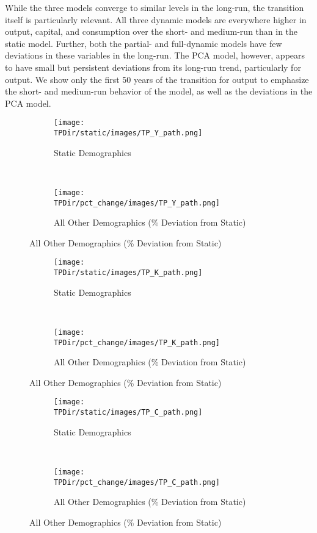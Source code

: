 \documentclass[10pt]{article}
\numberwithin{equation}{subsection}
\newcommand*{\TPDir}{../../code/Rick/OUTPUT/TP}
\begin{document}
\par While the three models converge to similar levels in the long-run, the transition itself is particularly relevant. All three dynamic models are everywhere higher in output, capital, and consumption over the short- and medium-run than in the static model. Further, both the partial- and full-dynamic models have few deviations in these variables in the long-run. The PCA model, however, appears to have small but persistent deviations from its long-run trend, particularly for output. We show only the first 50 years of the transition for output to emphasize the short- and medium-run behavior of the model, as well as the deviations in the PCA model.

\begin{figure}[H]
   \caption{\label{fig:tp_Y_pct}Time Path of Aggregate Output \(\hat{Y}_t\)}
   \begin{subfigure}{0.5\textwidth}
      \centering
      \texttt{[image: \\TPDir/static/images/TP\_Y\_path.png]}
      \caption{Static Demographics}
   \end{subfigure}%
   ~
   \begin{subfigure}{0.5\textwidth}
      \centering
      \texttt{[image: \\TPDir/pct\_change/images/TP\_Y\_path.png]}
      \caption{All Other Demographics (\% Deviation from Static)}
   \end{subfigure}
\end{figure}

\begin{figure}[H]
   \caption{\label{fig:tp_K_pct}Time Path of Aggregate Capital \(\hat{K}_t\)}
   \begin{subfigure}{0.5\textwidth}
      \centering
      \texttt{[image: \\TPDir/static/images/TP\_K\_path.png]}
      \caption{Static Demographics}
   \end{subfigure}%
   ~
   \begin{subfigure}{0.5\textwidth}
      \centering
      \texttt{[image: \\TPDir/pct\_change/images/TP\_K\_path.png]}
      \caption{All Other Demographics (\% Deviation from Static)}
   \end{subfigure}
\end{figure}

\begin{figure}[H]
   \caption{\label{fig:tp_C_pct}Time Path of Aggregate Consumption \(\hat{C}_t\)}
   \begin{subfigure}{0.5\textwidth}
      \centering
      \texttt{[image: \\TPDir/static/images/TP\_C\_path.png]}
      \caption{Static Demographics}
   \end{subfigure}%
   ~
   \begin{subfigure}{0.5\textwidth}
      \centering
      \texttt{[image: \\TPDir/pct\_change/images/TP\_C\_path.png]}
      \caption{All Other Demographics (\% Deviation from Static)}
   \end{subfigure}
\end{figure}
\end{document}
